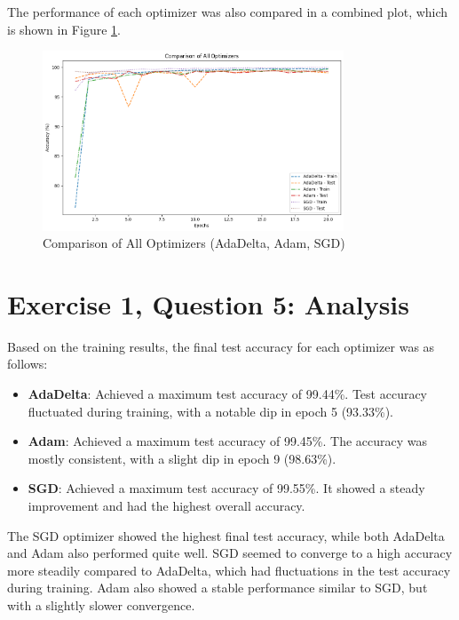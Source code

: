 \documentclass[10pt,letter,notitlepage]{article}
\begin{document}
\begin{center}
The performance of each optimizer was also compared in a combined plot, which is shown in Figure \ref{fig:optimizer_comparison}.

\begin{figure}[H]
    \centering
    \includegraphics[width=0.8\textwidth]{1.5.2.png}
    \caption{Comparison of All Optimizers (AdaDelta, Adam, SGD)}
    \label{fig:optimizer_comparison}
\end{figure}

\section{Exercise 1, Question 5: Analysis}
Based on the training results, the final test accuracy for each optimizer was as follows:
\begin{itemize}
    \item \textbf{AdaDelta}: Achieved a maximum test accuracy of 99.44\%. Test accuracy fluctuated during training, with a notable dip in epoch 5 (93.33\%).
    \item \textbf{Adam}: Achieved a maximum test accuracy of 99.45\%. The accuracy was mostly consistent, with a slight dip in epoch 9 (98.63\%).
    \item \textbf{SGD}: Achieved a maximum test accuracy of 99.55\%. It showed a steady improvement and had the highest overall accuracy.
\end{itemize}

The SGD optimizer showed the highest final test accuracy, while both AdaDelta and Adam also performed quite well. SGD seemed to converge to a high accuracy more steadily compared to AdaDelta, which had fluctuations in the test accuracy during training. Adam also showed a stable performance similar to SGD, but with a slightly slower convergence.


\end{center}
\end{document}
